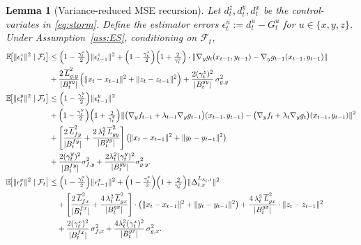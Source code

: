 \documentclass{uai2026} %
\newtheorem{lemma}{Lemma}[section]
\newcommand{\EE}{\mathbb{E}}
\newcommand{\F}{\mathcal{F}}
\begin{document}
\begin{lemma}[Variance-reduced MSE recursion]\label{lem:vr-ES}
Let $d_t^z,d_t^y,d_t^x$ be the control-variates in \eqref{eq:storm}.
Define
the estimator errors $\epsilon_t^u:=d_t^u-G_t^u$ for $u\in\{x,y,z\}$. Under Assumption~\ref{ass:ES},
conditioning on $\F_t$,
\begin{align}
\EE\!\big[\|\epsilon_t^z\|^2\mid\F_t\big]
&\le \Big(1-\tfrac{\gamma_t^z}{2}\Big)\|\epsilon_{t-1}^z\|^2
+ \Big(1-\tfrac{\gamma_t^z}{2}\Big)\Big(1+\tfrac{2}{\gamma_t^z}\Big)\cdot\|\nabla_{y}g_{t}(x_{t-1},y_{t-1})-\nabla_{y}g_{t-1}(x_{t-1},y_{t-1})\|\nonumber\\
&+ \frac{2\,\overline L_{g,y}^2}{|B_t^{gy}|}\Big(\|x_t-x_{t-1}\|^2+\|z_t-z_{t-1}\|^2\Big)
+ \frac{2(\gamma_t^z)^2}{|B_t^{gy}|}\,\sigma_{g,y}^2\label{eq:vrES-z}\\
\EE\!\big[\|\epsilon_t^y\|^2\mid\F_t\big]
&\le \Big(1-\tfrac{\gamma_t^y}{2}\Big)\|\epsilon_{t-1}^y\|^2\nonumber\\
&+ \Big(1-\tfrac{\gamma_t^y}{2}\Big)\Big(1+\tfrac{2}{\gamma_t^y}\Big)\|\big(\nabla_y f_{t-1}+\lambda_{t-1}\nabla_y g_{t-1}\big)(x_{t-1},y_{t-1})
-\big(\nabla_y f_t+\lambda_t\nabla_y g_t\big)(x_{t-1},y_{t-1})\|^{2} \notag\\
& + \left[\frac{2\,\overline L_{fy}^2}{|B_t^{fy}|}+\frac{2\,\lambda_t^2\,\overline L_{gy}^2}{|B_t^{gy}|} \right]\big(\|x_t-x_{t-1}\|^2+\|y_t-y_{t-1}\|^2\big)\notag\\
& + \frac{2(\gamma_t^y)^2}{|B_t^{fy}|}\sigma_{f,y}^2
+ \frac{2\lambda_t^2(\gamma_t^y)^2}{|B_t^{gy}|}\sigma_{g,y}^2.\\
\EE\!\big[\|\epsilon_t^x\|^2\mid\F_t\big]
&\le \Big(1-\tfrac{\gamma_t^x}{2}\Big)\|\epsilon_{t-1}^x\|^2
+ \Big(1-\tfrac{\gamma_t^x}{2}\Big)\Big(1+\tfrac{2}{\gamma_t^x}\Big)\|\Delta_{t,x}^{L_{\lambda_{t},t}}\|^2\notag\\
&\quad + \left[\frac{2\,\overline L_{fx}^2}{|B_t^{fx}|}+\frac{4\,\lambda_t^2\,\overline L_{gx}^2}{|B_t^{gx}|}\right]\cdot\big(\|x_t-x_{t-1}\|^2+\|y_t-y_{t-1}\|^2\big)
+ \frac{4\,\lambda_t^2\,\overline L_{gx}^2}{|B_t^{gx}|}\cdot\|z_t-z_{t-1}\|^2\notag\\
&\quad + \frac{2(\gamma_t^x)^2}{|B_t^{fx}|}\,\sigma_{f,x}^2
+ \frac{4\lambda_t^2(\gamma_t^x)^2}{|B_t^{gx}|}\,\sigma_{g,x}^2.
\end{align}
\end{lemma}
\end{document}
